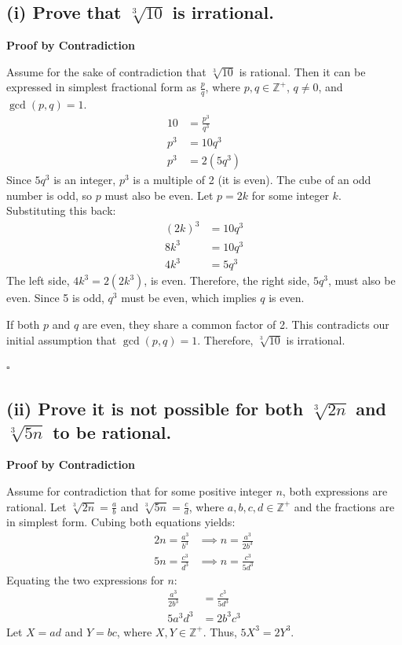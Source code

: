 \begin{solution}
\subsection*{(i) Prove that $\sqrt[3]{10}$ is irrational.}

\textbf{Proof by Contradiction}

Assume for the sake of contradiction that $\sqrt[3]{10}$ is rational. Then it can be expressed in simplest fractional form as $\frac{p}{q}$, where $p, q \in \mathbb{Z}^+$, $q \neq 0$, and $\gcd(p, q) = 1$.
\begin{align*}
    10 &= \frac{p^3}{q^3} \\
    p^3 &= 10q^3 \\
    p^3 &= 2(5q^3)
\end{align*}
Since $5q^3$ is an integer, $p^3$ is a multiple of 2 (it is even). The cube of an odd number is odd, so $p$ must also be even. 
Let $p = 2k$ for some integer $k$. Substituting this back:
\begin{align*}
    (2k)^3 &= 10q^3 \\
    8k^3 &= 10q^3 \\
    4k^3 &= 5q^3
\end{align*}
The left side, $4k^3 = 2(2k^3)$, is even. Therefore, the right side, $5q^3$, must also be even. Since 5 is odd, $q^3$ must be even, which implies $q$ is even. 

If both $p$ and $q$ are even, they share a common factor of 2. This contradicts our initial assumption that $\gcd(p, q) = 1$. Therefore, $\sqrt[3]{10}$ is irrational.

\hfill $\square$

\subsection*{(ii) Prove it is not possible for both $\sqrt[3]{2n}$ and $\sqrt[3]{5n}$ to be rational.}

\textbf{Proof by Contradiction}

Assume for contradiction that for some positive integer $n$, both expressions are rational. Let $\sqrt[3]{2n} = \frac{a}{b}$ and $\sqrt[3]{5n} = \frac{c}{d}$, where $a, b, c, d \in \mathbb{Z}^+$ and the fractions are in simplest form. Cubing both equations yields:
\begin{align*}
    2n = \frac{a^3}{b^3} &\implies n = \frac{a^3}{2b^3} \\
    5n = \frac{c^3}{d^3} &\implies n = \frac{c^3}{5d^3}
\end{align*}
Equating the two expressions for $n$:
\begin{align*}
    \frac{a^3}{2b^3} &= \frac{c^3}{5d^3} \\
    5a^3d^3 &= 2b^3c^3
\end{align*}
Let $X = ad$ and $Y = bc$, where $X, Y \in \mathbb{Z}^+$. Thus, $5X^3 = 2Y^3$.


\end{solution}
